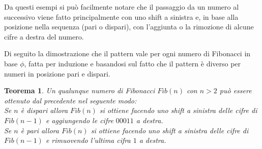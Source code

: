 \documentclass[Lau,oneside]{sapthesis}
\newtheorem{theorem}{Teorema}
\begin{document}
Da questi esempi si può facilmente notare che il passaggio da un numero al successivo viene fatto principalmente con uno shift a sinistra e, in base alla posizione nella sequenza (pari o dispari), con l'aggiunta o la rimozione di alcune cifre a destra del numero.

\medskip

Di seguito la dimostrazione che il pattern vale per ogni numero di Fibonacci in base $\phi$, fatta per induzione e basandosi sul fatto che il pattern è diverso per numeri in posizione pari e dispari.
\begin{theorem}
Un qualunque numero di Fibonacci $Fib(n)$ con $n>2$ può essere ottenuto dal precedente nel seguente modo:\\
Se $n$ è dispari allora $Fib(n)$ si ottiene facendo uno shift a sinistra delle cifre di $Fib(n-1)$ e aggiungendo le cifre $00011$ a destra.\\
Se $n$ è pari allora $Fib(n)$ si ottiene facendo uno shift a sinistra delle cifre di $Fib(n-1)$ e rimuovendo l'ultima cifra $1$ a destra.\\
\end{theorem}
\end{document}
